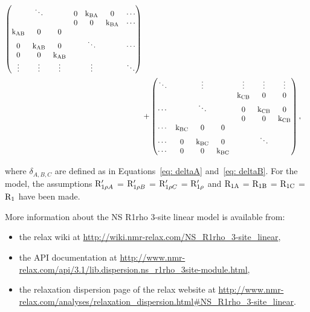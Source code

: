 \begin{align}
\begin{pmatrix}
                   & \ddots  &         & 0       & \textrm{k}_\textrm{BA}    & 0       & \cdots \\
                   &         &         & 0       & 0       & \textrm{k}_\textrm{BA}    & \cdots \\
           \textrm{k}_\textrm{AB}    & 0       & 0       &         &         &         & \\
           0       & \textrm{k}_\textrm{AB}    & 0       &         & \ddots  &         & \cdots\\
           0       & 0       & \textrm{k}_\textrm{AB}    &         &         &         & \\
           \vdots  & \vdots  & \vdots  &         & \vdots  &         & \ddots \\
         \end{pmatrix} \nonumber \\
      &+ \begin{pmatrix}
           \ddots  &         & \vdots  &         & \vdots  & \vdots  & \vdots \\
                   &         &         &         & \textrm{k}_\textrm{CB}    & 0       & 0 \\
           \cdots  &         & \ddots  &         & 0       & \textrm{k}_\textrm{CB}    & 0 \\
                   &         &         &         & 0       & 0       & \textrm{k}_\textrm{CB} \\
           \cdots  & \textrm{k}_\textrm{BC}    & 0       & 0       &         &         &  \\
           \cdots  & 0       & \textrm{k}_\textrm{BC}    & 0       &         & \ddots  &  \\
           \cdots  & 0       & 0       & \textrm{k}_\textrm{BC}    &         &         &  \\
         \end{pmatrix},
\end{align}

where $\delta_{A,B,C}$ are defined as in Equations~\ref{eq: deltaA} and~\ref{eq: deltaB}.
For the model, the assumptions $\mathrm{R}_{1\rho A}'$ = $\mathrm{R}_{1\rho B}'$ = $\mathrm{R}_{1\rho C}'$ = $\mathrm{R}_{1\rho}'$ and  $\mathrm{R}_\textrm{1A}$ = $\mathrm{R}_\textrm{1B}$ = $\mathrm{R}_\textrm{1C}$ = $\mathrm{R}_1$ have been made.

More information about the NS R1rho 3-site linear model is available from:
\begin{itemize}
  \item the relax wiki at \url{http://wiki.nmr-relax.com/NS\_R1rho\_3-site\_linear},
  \item the API documentation at \url{http://www.nmr-relax.com/api/3.1/lib.dispersion.ns\_r1rho\_3site-module.html},
  \item the relaxation dispersion page of the relax website at \url{http://www.nmr-relax.com/analyses/relaxation\_dispersion.html#NS\_R1rho\_3-site\_linear}.
\end{itemize}



